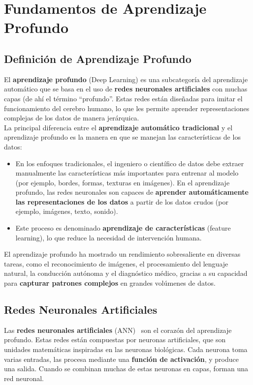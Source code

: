 \chapter{Fundamentos de Aprendizaje Profundo}\label{ch:fundamentos-de-aprendizaje-profundo}
\section{Definición de Aprendizaje Profundo}\label{sec:definicion-de-aprendizaje-profundo}
El \textbf{aprendizaje profundo} (Deep Learning) es una subcategoría del aprendizaje automático que se basa
en el uso de \textbf{redes neuronales artificiales} con muchas capas (de ahí el término ``profundo''.
Estas redes están diseñadas para imitar el funcionamiento del cerebro humano, lo que les permite aprender
representaciones complejas de los datos de manera jerárquica. \\[2pt]

La principal diferencia entre el \textbf{aprendizaje automático tradicional} y el aprendizaje profundo es la manera en
que se manejan las características de los datos:
\begin{itemize}
    \item En los enfoques tradicionales, el ingeniero o científico de datos debe extraer manualmente las
características más importantes para entrenar al modelo (por ejemplo, bordes, formas, texturas en imágenes).
En el aprendizaje profundo, las redes neuronales son capaces de
\textbf{aprender automáticamente las representaciones de los datos} a partir de los datos crudos (por ejemplo,
imágenes, texto, sonido).
    \item Este proceso es denominado \textbf{aprendizaje de características} (feature learning), lo que reduce la
necesidad de intervención humana.
\end{itemize}

El aprendizaje profundo ha mostrado un rendimiento sobresaliente en diversas tareas, como el reconocimiento de
imágenes, el procesamiento del lenguaje natural, la conducción autónoma y el diagnóstico médico, gracias a su capacidad
para \textbf{capturar patrones complejos} en grandes volúmenes de datos.

\section{Redes Neuronales Artificiales}\label{sec:redes-neuronales-artificiales}
Las \textbf{redes neuronales artificiales} (ANN)~\cite{Handbook of measuring system design} son el corazón del
aprendizaje profundo.
Estas redes están compuestas por neuronas artificiales, que son unidades matemáticas inspiradas en las neuronas
biológicas.
Cada neurona toma varias entradas, las procesa mediante una \textbf{función de activación}, y produce una salida.
Cuando se combinan muchas de estas neuronas en capas, forman una red neuronal.


